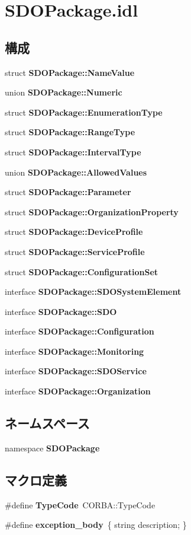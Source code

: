 \section{SDOPackage.idl}
\label{SDOPackage_8idl}
\subsection*{構成}
\begin{DoxyCompactItemize}
\item 
struct {\bf SDOPackage::NameValue}
\item 
union {\bf SDOPackage::Numeric}
\item 
struct {\bf SDOPackage::EnumerationType}
\item 
struct {\bf SDOPackage::RangeType}
\item 
struct {\bf SDOPackage::IntervalType}
\item 
union {\bf SDOPackage::AllowedValues}
\item 
struct {\bf SDOPackage::Parameter}
\item 
struct {\bf SDOPackage::OrganizationProperty}
\item 
struct {\bf SDOPackage::DeviceProfile}
\item 
struct {\bf SDOPackage::ServiceProfile}
\item 
struct {\bf SDOPackage::ConfigurationSet}
\item 
interface {\bf SDOPackage::SDOSystemElement}
\item 
interface {\bf SDOPackage::SDO}
\item 
interface {\bf SDOPackage::Configuration}
\item 
interface {\bf SDOPackage::Monitoring}
\item 
interface {\bf SDOPackage::SDOService}
\item 
interface {\bf SDOPackage::Organization}
\end{DoxyCompactItemize}
\subsection*{ネームスペース}
\begin{DoxyCompactItemize}
\item 
namespace {\bf SDOPackage}
\end{DoxyCompactItemize}
\subsection*{マクロ定義}
\begin{DoxyCompactItemize}
\item 
\#define {\bf TypeCode}~CORBA::TypeCode
\item 
\#define {\bf exception\_\-body}~\{ string description; \}
\end{DoxyCompactItemize}
